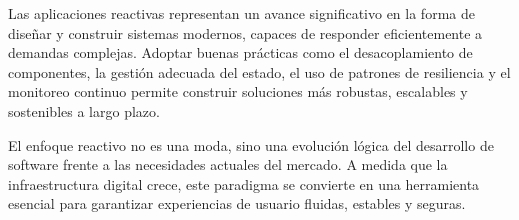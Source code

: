\documentclass{article}
\begin{document}
Las aplicaciones reactivas representan un avance significativo en la forma de diseñar y construir sistemas modernos, capaces de responder eficientemente a demandas complejas. Adoptar buenas prácticas como el desacoplamiento de componentes, la gestión adecuada del estado, el uso de patrones de resiliencia y el monitoreo continuo permite construir soluciones más robustas, escalables y sostenibles a largo plazo.

El enfoque reactivo no es una moda, sino una evolución lógica del desarrollo de software frente a las necesidades actuales del mercado. A medida que la infraestructura digital crece, este paradigma se convierte en una herramienta esencial para garantizar experiencias de usuario fluidas, estables y seguras.

\printbibliography
\end{document}
